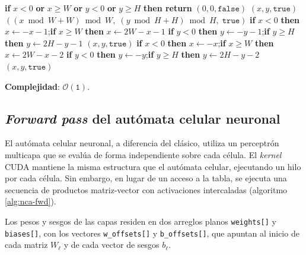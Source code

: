 \begin{breakablealgorithm}
\caption{ApplyBoundary: cuatro variantes especializadas en compilación}
\label{alg:frontera}
\footnotesize
\begin{algorithmic}[1]
    \State \textbf{if} $x < 0$ \textbf{or} $x \geq W$ \textbf{or} $y < 0$ \textbf{or} $y \geq H$ \textbf{then return} $(0, 0, \texttt{false})$
    \State \Return $(x, y, \texttt{true})$
\EndFunction
\Statex
{}
    \State \Return $((x \bmod W + W) \bmod W,\; (y \bmod H + H) \bmod H,\; \texttt{true})$
\EndFunction
\Statex
{}
    \State \textbf{if} $x < 0$ \textbf{then} $x \gets -x - 1$;\quad \textbf{if} $x \geq W$ \textbf{then} $x \gets 2W - x - 1$
    \State \textbf{if} $y < 0$ \textbf{then} $y \gets -y - 1$;\quad \textbf{if} $y \geq H$ \textbf{then} $y \gets 2H - y - 1$
    \State \Return $(x, y, \texttt{true})$
\EndFunction
\Statex
{}
    \State \textbf{if} $x < 0$ \textbf{then} $x \gets -x$;\quad \textbf{if} $x \geq W$ \textbf{then} $x \gets 2W - x - 2$
    \State \textbf{if} $y < 0$ \textbf{then} $y \gets -y$;\quad \textbf{if} $y \geq H$ \textbf{then} $y \gets 2H - y - 2$
    \State \Return $(x, y, \texttt{true})$
\EndFunction
\end{algorithmic}
\end{breakablealgorithm}

\textbf{Complejidad}: $\mathcal{O}(\texttt{1})$.

\subsection{\textit{Forward pass} del autómata celular neuronal}

El autómata celular neuronal, a diferencia del clásico, utiliza un perceptrón multicapa que se evalúa de forma independiente sobre cada célula. El \textit{kernel} CUDA mantiene la misma estructura que el autómata celular, ejecutando un hilo por cada célula. Sin embargo, en lugar de un acceso a la tabla, se ejecuta una secuencia de productos matriz-vector con activaciones intercaladas (algoritmo \ref{alg:nca-fwd}).

Los pesos y sesgos de las capas residen en dos arreglos planos \texttt{weights[]} y \texttt{biases[]}, con los vectores \texttt{w\_offsets[]} y \texttt{b\_offsets[]}, que apuntan al inicio de cada matriz $W_\ell$ y de cada vector de sesgos $b_\ell$. 

